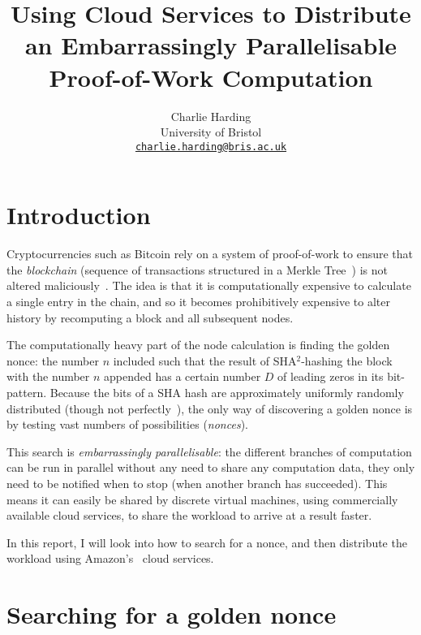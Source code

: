 \documentclass[letterpaper,twocolumn,11pt]{article}
\begin{document}
\title{Using Cloud Services to Distribute an Embarrassingly Parallelisable Proof-of-Work Computation}

\author{
{\rm Charlie Harding}\\
University of Bristol\\
\href{mailto:charlie.harding@bris.ac.uk}{\nolinkurl{charlie.harding@bris.ac.uk}}
}

\maketitle

\tableofcontents

\section{Introduction}

Cryptocurrencies such as Bitcoin rely on a system of proof-of-work to ensure that the \textit{blockchain} (sequence of transactions structured in a Merkle Tree~\cite{blockonomi_2018}) is not altered maliciously~\cite{bitcoin}. The idea is that it is computationally expensive to calculate a single entry in the chain, and so it becomes prohibitively expensive to alter history by recomputing a block and all subsequent nodes.

The computationally heavy part of the node calculation is finding the golden nonce: the number $n$ included such that the result of SHA$^2$-hashing the block with the number $n$ appended has a certain number $D$ of leading zeros in its bit-pattern. Because the bits of a SHA hash are approximately uniformly randomly distributed (though not perfectly~\cite{cryptoeprint:2008:441}), the only way of discovering a golden nonce is by testing vast numbers of possibilities (\textit{nonces}).

This search is \textit{embarrassingly parallelisable}: the different branches of computation can be run in parallel without any need to share any computation data, they only need to be notified when to stop (when another branch has succeeded). This means it can easily be shared by discrete virtual machines, using commercially available cloud services, to share the workload to arrive at a result faster.

In this report, I will look into how to search for a nonce, and then distribute the workload using Amazon's~\cite{aws} cloud services.

\section{Searching for a golden nonce}
\end{document}
